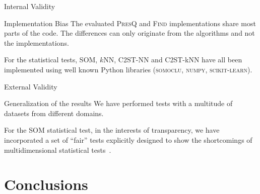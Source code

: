 \documentclass[10pt]{beamer}
\newcommand{\PresQ}[0]{\textsc{PresQ}\xspace}
\begin{document}
\begin{frame}{Internal Validity}
    \begin{alertblock}{Implementation Bias}
        \smallskip
        The evaluated \PresQ and \textsc{Find} implementations share most parts of the code. The differences can only originate
        from the algorithms and not the implementations.
        
        \smallskip
        
        For the statistical tests, SOM, $k$NN, C2ST-NN and C2ST-kNN have all been implemented using well known
        Python libraries (\textsc{somoclu}, \textsc{numpy}, \textsc{scikit-learn}).
    \end{alertblock}
\end{frame}

\begin{frame}{External Validity}
    \begin{alertblock}{Generalization of the results}
        \smallskip
        We have performed tests with a multitude of datasets from different domains.
        
        \smallskip

        For the SOM statistical test, in the interests of transparency, we have incorporated a set
        of ``fair'' tests explicitly designed to show the shortcomings of multidimensional statistical tests~\cite{ramdas2015decreasing}.
        
    \end{alertblock}
\end{frame}

\section{Conclusions}


\end{document}
